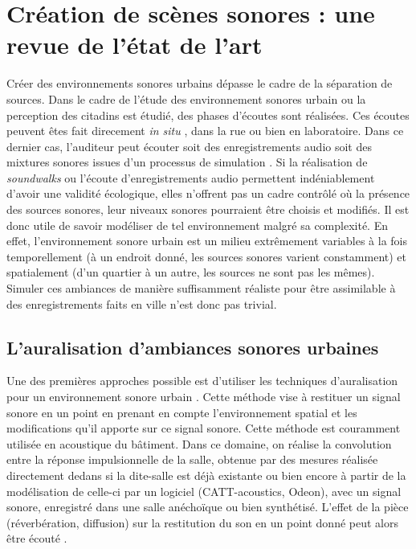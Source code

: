 \section{Création de scènes sonores : une revue de l'état de l'art}

Créer des environnements sonores urbains dépasse le cadre de la séparation de sources. 
Dans le cadre de l'étude des environnement sonores urbain ou la perception des citadins est étudié, des phases d'écoutes sont réalisées. Ces écoutes peuvent êtes fait direcement \textit{in situ} \cite{adams_soundwalking_2008} \cite{raimbault_ambient_2003}, dans la rue ou bien en laboratoire. Dans ce dernier cas, l'auditeur peut écouter soit des enregistrements audio \cite{guastavino2005ecological} soit des mixtures sonores issues d'un processus de simulation \cite{lafay_new_2014}. Si la réalisation de \textit{soundwalks} ou l'écoute d'enregistrements audio permettent indéniablement d'avoir une validité écologique, elles n'offrent pas un cadre contrôlé où la présence des sources sonores, leur niveaux sonores pourraient être choisis et modifiés. Il est donc utile de savoir modéliser de tel environnement malgré sa complexité. En effet, l'environnement sonore urbain est un milieu extrêmement variables à la fois temporellement (à un endroit donné, les sources sonores varient constamment) et spatialement (d'un quartier à un autre, les sources ne sont pas les mêmes). Simuler ces ambiances de manière suffisamment réaliste pour être assimilable à des enregistrements faits en ville n'est donc pas trivial. 


\subsection{L'auralisation d'ambiances sonores urbaines}
Une des premières approches possible est d'utiliser les techniques d'auralisation pour un environnement sonore urbain \cite{forssen2009auralization}. Cette méthode vise à restituer un signal sonore en un point en prenant en compte l'environnement spatial et les modifications qu'il apporte sur ce signal sonore. Cette méthode est couramment utilisée en acoustique du bâtiment. Dans ce domaine, on réalise la convolution entre la réponse impulsionnelle de la salle, obtenue par des mesures réalisée directement dedans si la dite-salle est déjà existante ou bien encore à partir de la modélisation de celle-ci par un logiciel (CATT-acoustics, Odeon), avec un signal sonore, enregistré dans une salle anéchoïque ou bien synthétisé. L'effet de la pièce (réverbération, diffusion) sur la restitution du son en un point donné peut alors être écouté \cite{vorlander2007auralization}.\\


